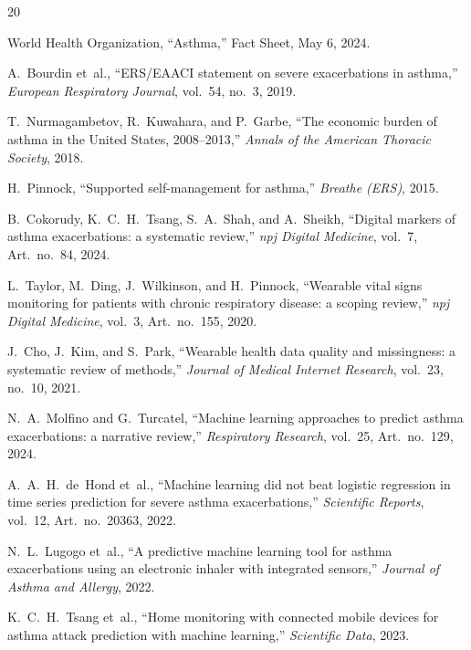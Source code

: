 \documentclass[11pt,a4paper]{article}
\begin{document}

\begin{thebibliography}{20}

World Health Organization, ``Asthma,'' Fact Sheet, May 6, 2024.

A.~Bourdin et~al., ``ERS/EAACI statement on severe exacerbations in
asthma,'' \emph{European Respiratory Journal}, vol.~54, no.~3, 2019.

T.~Nurmagambetov, R.~Kuwahara, and P.~Garbe, ``The economic burden of
asthma in the United States, 2008--2013,'' \emph{Annals of the American
Thoracic Society}, 2018.

H.~Pinnock, ``Supported self-management for asthma,''
\emph{Breathe (ERS)}, 2015.

B.~Cokorudy, K.~C.~H.~Tsang, S.~A.~Shah, and A.~Sheikh, ``Digital
markers of asthma exacerbations: a systematic review,''
\emph{npj Digital Medicine}, vol.~7, Art.~no.~84, 2024.

L.~Taylor, M.~Ding, J.~Wilkinson, and H.~Pinnock, ``Wearable vital
signs monitoring for patients with chronic respiratory disease: a
scoping review,'' \emph{npj Digital Medicine}, vol.~3, Art.~no.~155,
2020.

J.~Cho, J.~Kim, and S.~Park, ``Wearable health data quality and
missingness: a systematic review of methods,'' \emph{Journal of
Medical Internet Research}, vol.~23, no.~10, 2021.

N.~A.~Molfino and G.~Turcatel, ``Machine learning approaches to
predict asthma exacerbations: a narrative review,'' \emph{Respiratory
Research}, vol.~25, Art.~no.~129, 2024.

A.~A.~H.~de~Hond et~al., ``Machine learning did not beat logistic
regression in time series prediction for severe asthma exacerbations,''
\emph{Scientific Reports}, vol.~12, Art.~no.~20363, 2022.

N.~L.~Lugogo et~al., ``A predictive machine learning tool for asthma
exacerbations using an electronic inhaler with integrated sensors,''
\emph{Journal of Asthma and Allergy}, 2022.

K.~C.~H.~Tsang et~al., ``Home monitoring with connected mobile devices
for asthma attack prediction with machine learning,''
\emph{Scientific Data}, 2023.


\end{thebibliography}
\end{document}
